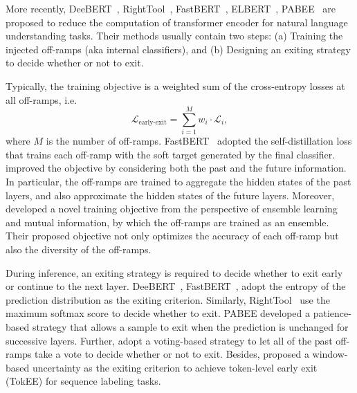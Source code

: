 \documentclass[fleqn]{SCYE-arxiv}
\begin{document}
\begin{multicols}{2}
More recently, DeeBERT~\cite{xin-etal-2020-deebert}, RightTool~\cite{DBLP:conf/acl/SchwartzSSDS20}, FastBERT~\cite{liu2020fastbert}, ELBERT~\cite{xie2021elbert}, PABEE~\cite{zhou2020bert} are proposed to reduce the computation of transformer encoder for natural language understanding tasks. Their methods usually contain two steps: (a) Training the injected off-ramps (aka internal classifiers), and (b) Designing an exiting strategy to decide whether or not to exit.

Typically, the training objective is a weighted sum of the cross-entropy losses at all off-ramps, i.e.
\begin{equation}
    \mathcal{L}_{\text{early-exit}} = \sum_{i=1}^{M} w_i\cdot \mathcal{L}_i,
\end{equation}
where $M$ is the number of off-ramps. FastBERT~\cite{liu2020fastbert} adopted the self-distillation loss that trains each off-ramp with the soft target generated by the final classifier. \citet{Liao2021Global} improved the objective by considering both the past and the future information. In particular, the off-ramps are trained to aggregate the hidden states of the past layers, and also approximate the hidden states of the future layers. Moreover, \citet{Sun2021Early} developed a novel training objective from the perspective of ensemble learning and mutual information, by which the off-ramps are trained as an ensemble. Their proposed objective not only optimizes the accuracy of each off-ramp but also the diversity of the off-ramps.

During inference, an exiting strategy is required to decide whether to exit early or continue to the next layer. DeeBERT~\cite{xin-etal-2020-deebert},  FastBERT~\cite{liu2020fastbert}, \citet{Liao2021Global} adopt the entropy of the prediction distribution as the exiting criterion. Similarly, RightTool~\cite{DBLP:conf/acl/SchwartzSSDS20} use the maximum softmax score to decide whether to exit. PABEE developed a patience-based strategy that allows a sample to exit when the prediction is unchanged for successive layers. Further, \citet{Sun2021Early} adopt a voting-based strategy to let all of the past off-ramps take a vote to decide whether or not to exit. Besides, \citet{li2021accelerating} proposed a window-based uncertainty as the exiting criterion to achieve token-level early exit (TokEE) for sequence labeling tasks.



\end{multicols}
\end{document}
